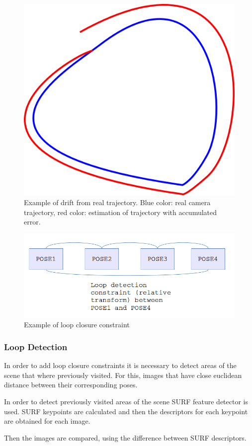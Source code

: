 \begin{figure}[!h]
\begin{center}
\includegraphics[scale=0.35]{images/drift}
\caption{Example of drift from real trajectory. Blue color: real camera trajectory, red color: estimation of trajectory with accumulated error.}
\end{center}
\end{figure}

\begin{figure}[!h]
\begin{center}
\includegraphics[scale=0.65]{images/loop_detection}
\caption{Example of loop closure constraint}
\end{center}
\end{figure}

\subsubsection{Loop Detection}

In order to add loop closure constraints it is necessary to detect areas of the scene 
 that where previously visited. For this, images that have close euclidean distance between 
their corresponding poses.

In order to detect previously visited areas of the scene SURF \cite{Bay06surf} feature detector 
is used. SURF keypoints are calculated and then the descriptors for each keypoint are obtained for 
each image.

 Then  the images are compared, using the difference between SURF descriptors.   

